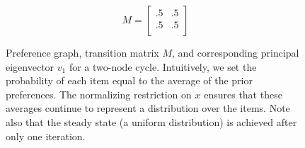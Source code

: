 \begin{figure}[!htb] %
\centering
\begin{minipage}{1.2in}
\end{minipage}
\hfill
\begin{minipage}{1.2in}
\[
M=
  \begin{bmatrix}
    .5 & .5 \\
    .5 & .5 \\
  \end{bmatrix}
\]
\end{minipage}
\hfill
\begin{minipage}{1.2in}
\end{minipage}
\caption{Preference graph, transition matrix $M$, and corresponding principal eigenvector $v_1$ for a two-node cycle. Intuitively, we set the probability of each item equal to the average of the prior preferences. The normalizing restriction on $x$ ensures that these averages continue to represent a distribution over the items. Note also that the steady state (a uniform distribution) is achieved after only one iteration.}
\label{fig:linalg_2} 
\end{figure}



